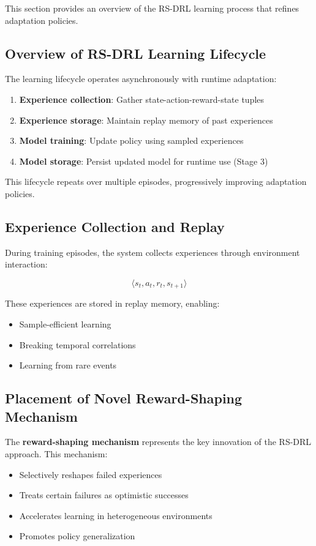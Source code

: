 \documentclass[11pt,a4paper]{article}
\begin{document}
This section provides an overview of the RS-DRL learning process that refines adaptation policies.

\subsection{Overview of RS-DRL Learning Lifecycle}

The learning lifecycle operates asynchronously with runtime adaptation:

\begin{enumerate}
    \item \textbf{Experience collection}: Gather state-action-reward-state tuples
    \item \textbf{Experience storage}: Maintain replay memory of past experiences
    \item \textbf{Model training}: Update policy using sampled experiences
    \item \textbf{Model storage}: Persist updated model for runtime use (Stage 3)
\end{enumerate}

This lifecycle repeats over multiple episodes, progressively improving adaptation policies.

\subsection{Experience Collection and Replay}

During training episodes, the system collects experiences through environment interaction:

\[
\langle s_t, a_t, r_t, s_{t+1} \rangle
\]

These experiences are stored in replay memory, enabling:
\begin{itemize}
    \item Sample-efficient learning
    \item Breaking temporal correlations
    \item Learning from rare events
\end{itemize}

\subsection{Placement of Novel Reward-Shaping Mechanism}

The \textbf{reward-shaping mechanism} represents the key innovation of the RS-DRL approach. This mechanism:

\begin{itemize}
    \item Selectively reshapes failed experiences
    \item Treats certain failures as optimistic successes
    \item Accelerates learning in heterogeneous environments
    \item Promotes policy generalization
\end{itemize}
\end{document}
